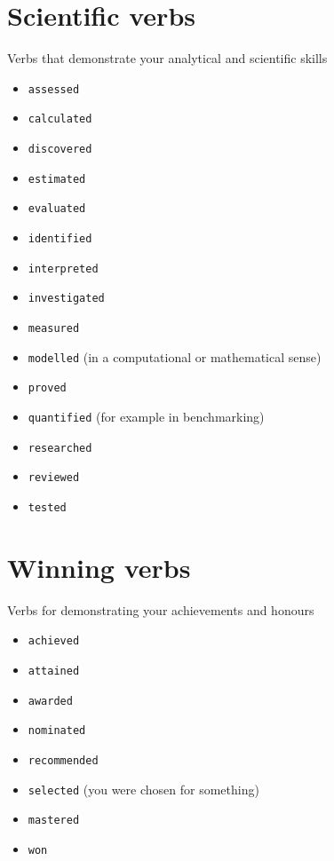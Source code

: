 \documentclass[
]{book}
\providecommand{\tightlist}{%
  \setlength{\itemsep}{0pt}\setlength{\parskip}{0pt}}
\begin{document}
\hypertarget{scientific}{%
\section{Scientific verbs}\label{scientific}}

Verbs that demonstrate your analytical and scientific skills

\begin{itemize}
\tightlist
\item
  \texttt{assessed}
\item
  \texttt{calculated}
\item
  \texttt{discovered}
\item
  \texttt{estimated}
\item
  \texttt{evaluated}
\item
  \texttt{identified}
\item
  \texttt{interpreted}
\item
  \texttt{investigated}
\item
  \texttt{measured}
\item
  \texttt{modelled} (in a computational or mathematical sense)
\item
  \texttt{proved}
\item
  \texttt{quantified} (for example in benchmarking)
\item
  \texttt{researched}~\\
\item
  \texttt{reviewed}
\item
  \texttt{tested}
\end{itemize}

\hypertarget{winning}{%
\section{Winning verbs}\label{winning}}

Verbs for demonstrating your achievements and honours

\begin{itemize}
\tightlist
\item
  \texttt{achieved}
\item
  \texttt{attained}
\item
  \texttt{awarded}
\item
  \texttt{nominated}
\item
  \texttt{recommended}
\item
  \texttt{selected} (you were chosen for something)
\item
  \texttt{mastered}
\item
  \texttt{won}
\end{itemize}
\end{document}
